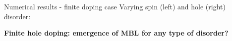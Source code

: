 \documentclass[1pt]{beamer}
\begin{document}

\begin{frame}{Numerical results - finite doping case}
\centering Varying spin (left) and hole (right) disorder:
\begin{figure}
\end{figure}
\textbf{Finite hole doping: emergence of MBL for any type of disorder?}
\end{frame}
\end{document}
